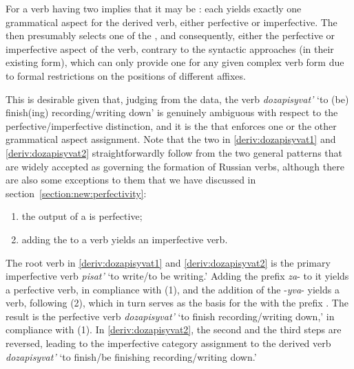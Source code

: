 For a verb having two  implies that it may be : each  yields exactly one grammatical aspect for the derived verb, either perfective or imperfective. The  then presumably selects one of the , and consequently, either the perfective or imperfective aspect of the verb, contrary to the syntactic approaches (in their existing form), which can only provide one  for any given complex verb form due to formal restrictions on the positions of different affixes.

This is desirable given that, judging from the data, the verb \textit{dozapisyvat'} `to (be) finish(ing) recording/writing down' is genuinely ambiguous with respect to the perfective/imperfective distinction, and it is the  that enforces one or the other grammatical aspect assignment. Note that the two  in \ref{deriv:dozapisyvat1} and \ref{deriv:dozapisyvat2} straightforwardly follow from the two general patterns that are widely accepted as governing the formation of Russian verbs, although there are also some exceptions to them that we have discussed in section~\ref{section:new:perfectivity}:

\begin{enumerate}
\item the output of a  is perfective;   
\item adding the  to a verb yields an imperfective verb. 
\end{enumerate}

The root verb in \ref{deriv:dozapisyvat1} and \ref{deriv:dozapisyvat2} is the primary imperfective verb \textit{pisat'} `to write/to be writing.' Adding the prefix \textit{za}- to it yields a perfective verb, in compliance with (1), and the addition of the  -\textit{yva}- yields a  verb, following (2), which in turn serves as the basis for the  with the  prefix . The result is the perfective verb \textit{dozapisyvat'} `to finish recording/writing down,' in compliance with (1).  In \ref{deriv:dozapisyvat2}, the second and the third steps are reversed, leading to the imperfective category assignment to the derived verb \textit{dozapisyvat'} `to finish/be finishing recording/writing down.'

